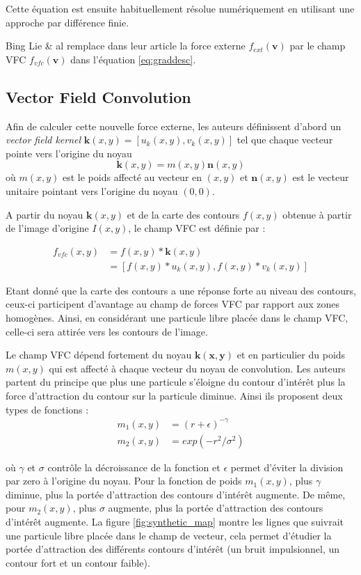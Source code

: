 Cette équation est ensuite habituellement résolue numériquement en utilisant une approche par différence finie.

Bing Lie \& al remplace dans leur article la force externe $f_{ext}(\mathbf{v})$ par le champ VFC $f_{vfc}(\mathbf{v})$ dans l'équation \ref{eq:graddesc}.

\subsection{Vector Field Convolution}

Afin de calculer cette nouvelle force externe, les auteurs définissent d'abord un \textit{vector field kernel} $\mathbf{k}(x,y)=[u_k(x,y),v_k(x,y)]$ tel que chaque vecteur pointe vers l'origine du noyau 
\begin{equation}
	\mathbf{k}(x,y)=m(x,y)\mathbf{n}(x,y)
\end{equation}
où $m(x,y)$ est le poids affecté au vecteur en $(x,y)$ et $\mathbf{n}(x,y)$ est le vecteur unitaire pointant vers l'origine du noyau $(0,0)$.

A partir du noyau $\mathbf{k}(x,y)$ et de la carte des contours $f(x,y)$ obtenue à partir de l'image d'origine $I(x,y)$, le champ VFC est définie par :

\begin{align*}
	f_{vfc}(x,y) & = f(x,y)*\mathbf{k}(x,y) \\
				 & = [f(x,y)*u_k(x,y),f(x,y)*v_k(x,y)]
\end{align*}

Etant donné que la carte des contours a une réponse forte au niveau des contours, ceux-ci participent d'avantage au champ de forces VFC par rapport aux zones homogènes. Ainsi, en considérant une particule libre placée dans le champ VFC, celle-ci sera attirée vers les contours de l'image. 

Le champ VFC dépend fortement du noyau $\mathbf{k(x,y)}$ et en particulier du poids $m(x,y)$ qui est affecté à chaque vecteur du noyau de convolution. Les auteurs partent du principe que plus une particule s'éloigne du contour d'intérêt plus la force d'attraction du contour sur la particule diminue. Ainsi ils proposent deux types de fonctions :
\begin{align}
	m_1(x,y) & = (r+\epsilon)^{-\gamma} \\
	m_2(x,y) & = exp(-r^2/\sigma^2)
\end{align}

où $\gamma$ et $\sigma$ contrôle la décroissance de la fonction et $\epsilon$ permet d'éviter la division par zero à l'origine du noyau. Pour la fonction de poids $m_1(x,y)$, plus $\gamma$ diminue, plus la portée d'attraction des contours d'intérêt augmente. De même, pour $m_2(x,y)$, plus $\sigma$ augmente, plus la portée d'attraction des contours d'intérêt augmente. La figure \ref{fig:synthetic_map} montre les lignes que suivrait une particule libre placée dans le champ de vecteur, cela permet d'étudier la portée d'attraction des différents contours d'intérêt (un bruit impulsionnel, un contour fort et un contour faible).



